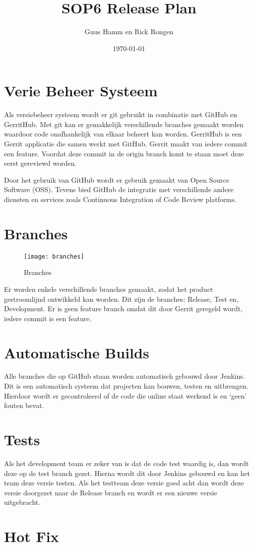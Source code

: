 \documentclass{scrreprt}
\title{SOP6 Release Plan}
\author{Guus Hamm en Rick Rongen}
\date{\today}
\begin{document}
	\maketitle
	\tableofcontents
	\newpage
	\chapter{Verie Beheer Systeem}
	Als versiebeheer systeem wordt er git gebruikt in combinatie met GitHub en GerritHub. Met git kan er gemakkelijk verschillende branches gemaakt worden waardoor code onafhankelijk van elkaar beheert kan worden.
	GerritHub is een Gerrit applicatie die samen werkt met GitHub. Gerrit maakt van iedere commit een feature. Voordat deze commit in de origin branch komt te staan moet deze eerst gereviewd worden. 
	
	Door het gebruik van GitHub wordt er gebruik gemaakt van Open Source Software (OSS). Tevens bied GitHub de integratie met verschillende andere diensten en services zoals Continuous Integration of Code Review platforms.
	\chapter{Branches}
	\begin{figure}
		\centering
		\texttt{[image: branches]}
		\caption{Branches}
		\label{img:branches}
	\end{figure}
	Er worden enkele verschillende branches gemaakt, zodat het product gestroomlijnd ontwikkeld kan worden. Dit zijn de branches: Release, Test en, Development. Er is geen feature branch omdat dit door Gerrit geregeld wordt, iedere commit is een feature.
	\chapter{Automatische Builds}
	Alle branches die op GitHub staan worden automatisch gebouwd door Jenkins. Dit is een automatisch systeem dat projecten kan bouwen, testen en uitbrengen. Hierdoor wordt er gecontroleerd of de code die online staat werkend is en ‘geen’ fouten bevat.
	\chapter{Tests}
	Als het development team er zeker van is dat de code test waardig is, dan wordt deze op de test branch gezet. Hierna wordt dit door Jenkins gebouwd en kan het team deze versie testen. Als het testteam deze versie goed acht dan wordt deze versie doorgezet naar de Release branch en wordt er een nieuwe versie uitgebracht.
	\chapter{Hot Fix}
\end{document}
